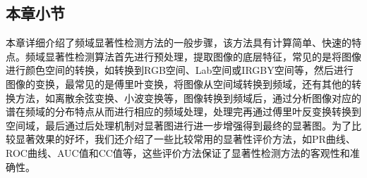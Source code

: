 \subsection{本章小节}
\label{2_5_5}

本章详细介绍了频域显著性检测方法的一般步骤，该方法具有计算简单、快速的特点。频域显著性检测算法首先进行预处理，提取图像的底层特征，常见的是将图像进行颜色空间的转换，如转换到RGB空间、Lab空间或IRGBY空间等，然后进行图像的变换，最常见的是傅里叶变换，将图像从空间域转换到频域，还有其他的转换方法，如离散余弦变换、小波变换等，图像转换到频域后，通过分析图像对应的谱在频域的分布特点从而进行相应的频域处理，处理完再通过傅里叶反变换转换到空间域，最后通过后处理机制对显著图进行进一步增强得到最终的显著图。为了比较显著效果的好坏，我们还介绍了一些比较常用的显著性评价方法，如PR曲线、ROC曲线、AUC值和CC值等，这些评价方法保证了显著性检测方法的客观性和准确性。
